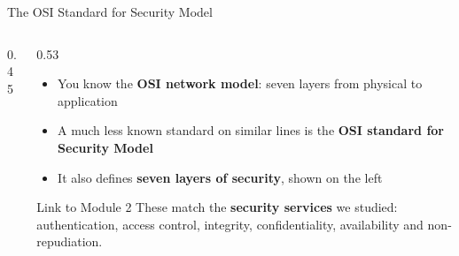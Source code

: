 \documentclass[aspectratio=169,11pt,xcolor={table}]{beamer}
\begin{document}
\begin{frame}{The OSI Standard for Security Model}
  \begin{columns}[c]
    \begin{column}{0.45\textwidth}
      \centering
    \end{column}
    \begin{column}{0.53\textwidth}
      \begin{itemize}\small\setlength{\itemsep}{5pt}
        \item You know the \textbf{OSI network model}: seven layers from physical to application
        \item A much less known standard on similar lines is the \textbf{OSI standard for Security Model}
        \item It also defines \textbf{seven layers of security}, shown on the left
      \end{itemize}
      \begin{block}{Link to Module 2}
        \small These match the \textbf{security services} we studied: authentication, access control, integrity, confidentiality, availability and non-repudiation.
      \end{block}
    \end{column}
  \end{columns}
\end{frame}
\end{document}

